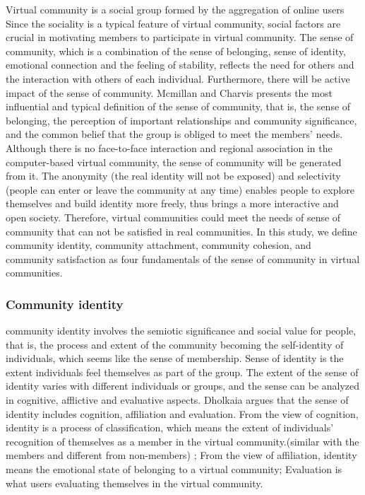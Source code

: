 \documentclass{elsarticle}
\begin{document}
Virtual community is a social group formed by the aggregation of online users Since the sociality is a typical feature of virtual community, social factors are crucial in motivating members to participate in virtual community. The sense of community, which is a combination of the sense of belonging, sense of identity, emotional connection and the feeling of stability, reflects the need for others and the interaction with others of each individual. Furthermore, there will be active impact of the sense of community. Mcmillan and Charvis presents the most influential and typical definition of the sense of community, that is, the sense of belonging, the perception of important relationships and community significance, and the common belief that the group is obliged to meet the members’ needs\cite{mcmillan1986scd}. Although there is no face-to-face interaction and regional association in the computer-based virtual community, the sense of community will be generated from it. The anonymity (the real identity will not be exposed) and selectivity (people can enter or leave the community at any time) enables people to explore themselves and build identity more freely, thus brings a more interactive and open society. Therefore, virtual communities could meet the needs of sense of community that can not be satisfied in real communities. In this study, we define community identity, community attachment, community cohesion, and community satisfaction as four fundamentals of the sense of community in virtual communities.      

\subsubsection{Community identity}
\label{sec:community-identiy}

community identity involves the semiotic significance and social value for people, that is, the process and extent of the community becoming the self-identity of individuals, which seems like the sense of membership. Sense of identity is the extent individuals feel themselves as part of the group. The extent of the sense of identity varies with different individuals or groups, and the sense can be analyzed in cognitive, afflictive and evaluative aspects\cite{warren1972ca}. Dholkaia argues that the sense of identity includes cognition, affiliation and evaluation\cite{dholakia2004sim}. From the view of cognition, identity is a process of classification, which means the extent of individuals’ recognition of themselves as a member in the virtual community.(similar with the members and different from non-members) ; From the view of affiliation, identity means the emotional state of belonging to a virtual community; Evaluation is what users evaluating themselves in the virtual community.    
\end{document}
